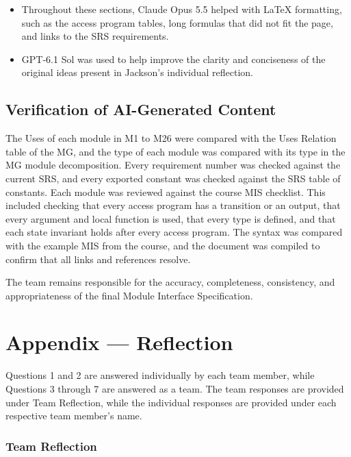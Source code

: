 \documentclass[10pt, titlepage]{article}
\begin{document}
\begin{itemize}
    \item Throughout these sections, Claude Opus 5.5 helped with \LaTeX{}
    formatting, such as the access program tables, long formulas that did not
    fit the page, and links to the SRS requirements.

    \item GPT-6.1 Sol was used to help improve the clarity and conciseness of the original ideas present in Jackson's individual reflection.
\end{itemize}

\subsection{Verification of AI-Generated Content}

The Uses of each module in M1 to M26 were compared with the Uses Relation
table of the MG, and the type of each module was compared with its type in the
MG module decomposition. Every requirement number was checked against the
current SRS, and every exported constant was checked against the SRS table of
constants. Each module
was reviewed against the course MIS checklist. This included checking that
every access program has a transition or an output, that every argument and
local function is used, that every type is defined, and that each state
invariant holds after every access program. The syntax was compared with the
example MIS from the course, and the document was compiled to confirm that all
links and references resolve.

The team remains responsible for the accuracy, completeness, consistency, and
appropriateness of the final Module Interface Specification.

\newpage{}

\section{Appendix --- Reflection}\label{sec:Reflection}

Questions 1 and 2 are answered individually by each team member, while
Questions 3 through 7 are answered as a team. The team responses are
provided under Team Reflection, while the individual responses are provided
under each respective team member's name.

\subsubsection*{Team Reflection}
\end{document}
